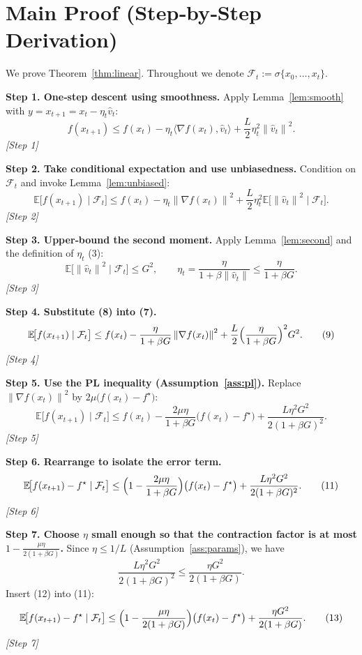 \documentclass[11pt]{article}
\newcommand{\E}{\mathbb{E}}
\newcommand{\norm}[1]{\left\lVert#1\right\rVert}
\newcommand{\grad}{\nabla}
\begin{document}
\section*{Main Proof (Step‑by‑Step Derivation)}
We prove Theorem~\ref{thm:linear}.  Throughout we denote $\mathcal{F}_t:=\sigma\{x_0,\dots,x_t\}$.

\noindent\textbf{Step 1.  One‑step descent using smoothness.}  
Apply Lemma~\ref{lem:smooth} with $y=x_{t+1}=x_t-\eta_t\hat v_t$:
\[
f(x_{t+1})\le f(x_t)-\eta_t\langle\grad f(x_t),\hat v_t\rangle+\frac{L}{2}\eta_t^2\norm{\hat v_t}^2.
\tag{6}
\]
\textit{[Step 1]}

\noindent\textbf{Step 2.  Take conditional expectation and use unbiasedness.}  
Condition on $\mathcal{F}_t$ and invoke Lemma~\ref{lem:unbiased}:
\[
\E\!\bigl[f(x_{t+1})\mid\mathcal{F}_t\bigr]\le f(x_t)-\eta_t\norm{\grad f(x_t)}^2+\frac{L}{2}\eta_t^2\E\!\bigl[\norm{\hat v_t}^2\mid\mathcal{F}_t\bigr].
\tag{7}
\]
\textit{[Step 2]}

\noindent\textbf{Step 3.  Upper‑bound the second moment.}  
Apply Lemma~\ref{lem:second} and the definition of $\eta_t$ (3):
\[
\E\!\bigl[\norm{\hat v_t}^2\mid\mathcal{F}_t\bigr]\le G^2,
\qquad 
\eta_t = \frac{\eta}{1+\beta\norm{\hat v_t}}\le\frac{\eta}{1+\beta G}.
\tag{8}
\]
\textit{[Step 3]}

\noindent\textbf{Step 4.  Substitute (8) into (7).}
\[
\E\!\bigl[f(x_{t+1})\mid\mathcal{F}_t\bigr]\le 
f(x_t)-\frac{\eta}{1+\beta G}\norm{\grad f(x_t)}^2
+\frac{L}{2}\Bigl(\frac{\eta}{1+\beta G}\Bigr)^2 G^2.
\tag{9}
\]
\textit{[Step 4]}

\noindent\textbf{Step 5.  Use the PL inequality (Assumption~\ref{ass:pl}).}  
Replace $\norm{\grad f(x_t)}^2$ by $2\mu\bigl(f(x_t)-f^\star\bigr)$:
\[
\E\!\bigl[f(x_{t+1})\mid\mathcal{F}_t\bigr]\le 
f(x_t)-\frac{2\mu\eta}{1+\beta G}\bigl(f(x_t)-f^\star\bigr)
+\frac{L\eta^2G^2}{2(1+\beta G)^2}.
\tag{10}
\]
\textit{[Step 5]}

\noindent\textbf{Step 6.  Rearrange to isolate the error term.}
\[
\E\!\bigl[f(x_{t+1})-f^\star\mid\mathcal{F}_t\bigr]\le 
\Bigl(1-\frac{2\mu\eta}{1+\beta G}\Bigr)\bigl(f(x_t)-f^\star\bigr)
+\frac{L\eta^2G^2}{2(1+\beta G)^2}.
\tag{11}
\]
\textit{[Step 6]}

\noindent\textbf{Step 7.  Choose $\eta$ small enough so that the contraction factor is at most $1-\frac{\mu\eta}{2(1+\beta G)}$.}  
Since $\eta\le 1/L$ (Assumption~\ref{ass:params}), we have
\[
\frac{L\eta^2G^2}{2(1+\beta G)^2}\le \frac{\eta G^2}{2(1+\beta G)}.
\tag{12}
\]
Insert (12) into (11):
\[
\E\!\bigl[f(x_{t+1})-f^\star\mid\mathcal{F}_t\bigr]\le 
\Bigl(1-\frac{\mu\eta}{2(1+\beta G)}\Bigr)\bigl(f(x_t)-f^\star\bigr)
+\frac{\eta G^2}{2(1+\beta G)}.
\tag{13}
\]
\textit{[Step 7]}
\end{document}
